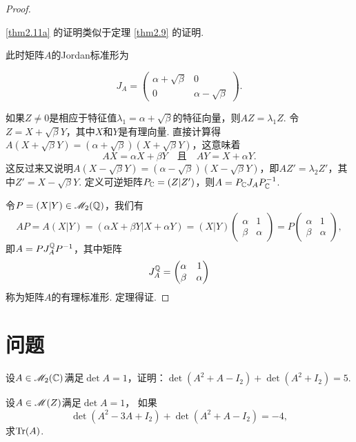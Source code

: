 \begin{proof}
  \begin{enuma}
    \item \ref{thm2.11a} 的证明类似于定理 \ref{thm2.9} 的证明.
    \item 此时矩阵$A$的Jordan标准形为
  \end{enuma}
  \[
      J_A = \begin{pmatrix}
        \alpha + \sqrt{\beta} & 0 \\
        0 & \alpha - \sqrt{\beta}
      \end{pmatrix}.
    \]

    如果$Z\ne0$是相应于特征值$\lambda_1=\alpha+\sqrt{\beta}$的特征向量，则$AZ=\lambda_1Z$. 令$Z=X+\sqrt\beta Y$，其中$X$和$Y$是有理向量. 直接计算得$A(X+\sqrt\beta Y)=(\alpha+\sqrt\beta)(X+\sqrt\beta Y)$，这意味着
    \[
      AX = \alpha X + \beta Y \quad \text{且}\quad
      AY = X + \alpha Y.
    \]
    这反过来又说明$A(X-\sqrt\beta Y)=(\alpha-\sqrt\beta)(X-\sqrt\beta Y)$，即$AZ'=\lambda_2Z'$，其中$Z'=X-\sqrt\beta Y$. 定义可逆矩阵$P_{\mathbb C}=(Z|Z')$，则$A=P_{\mathbb C}J_AP_{\mathbb C}^{-1}$.

    令$P=(X|Y)\in\mathscr M_2(\mathbb Q)$，我们有
    \[
      AP = A(X|Y) = (\alpha X+\beta Y|X + \alpha Y) = (X|Y)\begin{pmatrix}
        \alpha & 1 \\
        \beta & \alpha
      \end{pmatrix} = P\begin{pmatrix}
        \alpha & 1 \\
        \beta & \alpha
      \end{pmatrix},
    \]
    即$A=PJ_A^{\mathbb Q}P^{-1}$，其中矩阵
    \[
      J_A^{\mathbb Q} = \begin{pmatrix}
        \alpha & 1 \\
        \beta & \alpha
      \end{pmatrix}
    \]
    称为矩阵$A$的{\kaishu 有理标准形}. 定理得证.
\end{proof}

\section{问题}
\begin{problem}
  设$A\in\mathscr M_2(\mathbb C)$满足$\det A=1$，证明：$\det(A^2+A-I_2)+\det(A^2+I_2)=5$.
\end{problem}

\begin{problem}
  设$A\in\mathscr M(Z)$满足$\det A=1$， 如果
  \[
    \det (A^2 - 3A + I_2) + \det (A^2 + A - I_2) = -4,
  \]
  求$\operatorname{Tr}(A)$.
\end{problem}


